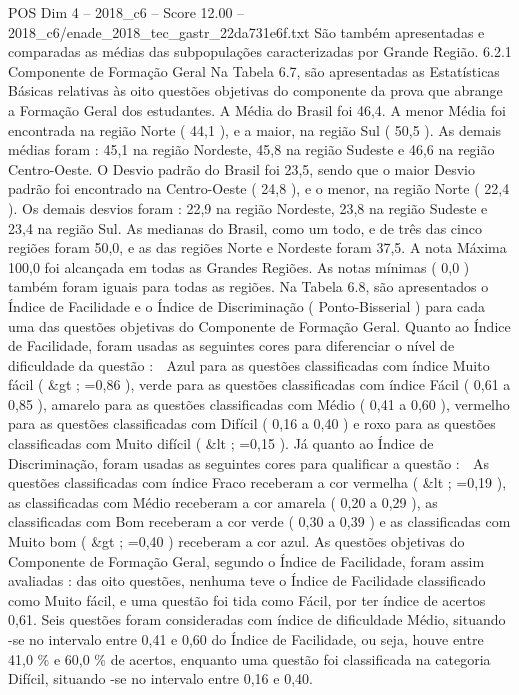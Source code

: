 \begin{textsample}{POS Dim 4 – 2018\_c6 – Score 12.00 – 2018\_c6/enade\_2018\_tec\_gastr\_22da731e6f.txt}
São também apresentadas e comparadas as médias das subpopulações caracterizadas por Grande Região. 6.2.1 Componente de Formação Geral Na Tabela 6.7, são apresentadas as Estatísticas Básicas relativas às oito questões objetivas do componente da prova que abrange a Formação Geral dos estudantes.
A Média do Brasil foi 46,4.
A menor Média foi encontrada na região Norte ( 44,1 ), e a maior, na região Sul ( 50,5 ).
As demais médias foram : 45,1 na região Nordeste, 45,8 na região Sudeste e 46,6 na região Centro-Oeste.
O Desvio padrão do Brasil foi 23,5, sendo que o maior Desvio padrão foi encontrado na Centro-Oeste ( 24,8 ), e o menor, na região Norte ( 22,4 ).
Os demais desvios foram : 22,9 na região Nordeste, 23,8 na região Sudeste e 23,4 na região Sul.
As medianas do Brasil, como um todo, e de três das cinco regiões foram 50,0, e as das regiões Norte e Nordeste foram 37,5.
A nota Máxima 100,0 foi alcançada em todas as Grandes Regiões.
As notas mínimas ( 0,0 ) também foram iguais para todas as regiões.
Na Tabela 6.8, são apresentados o Índice de Facilidade e o Índice de Discriminação ( Ponto-Bisserial ) para cada uma das questões objetivas do Componente de Formação Geral.
Quanto ao Índice de Facilidade, foram usadas as seguintes cores para diferenciar o nível de dificuldade da questão :  Azul para as questões classificadas com índice Muito fácil ( \&gt ; =0,86 ), verde para as questões classificadas com índice Fácil ( 0,61 a 0,85 ), amarelo para as questões classificadas com Médio ( 0,41 a 0,60 ), vermelho para as questões classificadas com Difícil ( 0,16 a 0,40 ) e roxo para as questões classificadas com Muito difícil ( \&lt ; =0,15 ).
Já quanto ao Índice de Discriminação, foram usadas as seguintes cores para qualificar a questão :  As questões classificadas com índice Fraco receberam a cor vermelha ( \&lt ; =0,19 ), as classificadas com Médio receberam a cor amarela ( 0,20 a 0,29 ), as classificadas com Bom receberam a cor verde ( 0,30 a 0,39 ) e as classificadas com Muito bom ( \&gt ; =0,40 ) receberam a cor azul.
As questões objetivas do Componente de Formação Geral, segundo o Índice de Facilidade, foram assim avaliadas : das oito questões, nenhuma teve o Índice de Facilidade classificado como Muito fácil, e uma questão foi tida como Fácil, por ter índice de acertos 0,61.
Seis questões foram consideradas com índice de dificuldade Médio, situando -se no intervalo entre 0,41 e 0,60 do Índice de Facilidade, ou seja, houve entre 41,0 \% e 60,0 \% de acertos, enquanto uma questão foi classificada na categoria Difícil, situando -se no intervalo entre 0,16 e 0,40.

\end{textsample}
